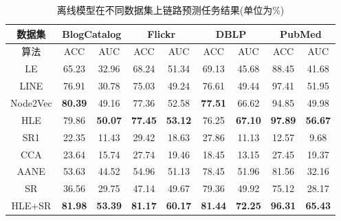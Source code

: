 \begin{table}[]
	\centering
	\caption{离线模型在不同数据集上链路预测任务结果(单位为\%)}
	\label{tab:off_link_prediction}
	\begin{tabular}{|c||c|c||c|c||c|c||c|c|}
		\hline
		数据集      & \multicolumn{2}{c||}{BlogCatalog} & \multicolumn{2}{c||}{Flickr}     & \multicolumn{2}{c||}{DBLP}   & \multicolumn{2}{c|}{PubMed}     \\ \hline\hline
		算法       & ACC             & AUC            & ACC            & AUC            & ACC            & AUC            & ACC            & AUC            \\ \hline
		LE       & 65.23           & 32.96          & 68.24          & 51.34          & 69.13          & 45.68          & 88.45          & 41.68          \\ \hline
		LINE     & 76.91           & 30.78          & 75.03          & 49.24          & 76.61          & 49.44          & 97.41          & 51.95 \\ \hline
		Node2Vec & \textbf{80.39}  & 49.16          & 77.36          & 52.58          & \textbf{77.51} & 66.62          & 94.85          & 49.98          \\ \hline
		HLE      & 79.86           & \textbf{50.07} & \textbf{77.45} & \textbf{53.12} & 76.25          & \textbf{67.10} & \textbf{97.89} & \textbf{56.67}          \\ \hline\hline
		SR1      & 22.35           & 11.43          & 29.42          & 18.63          & 27.86          & 11.13          & 12.57          & 9.68           \\ \hline\hline
		CCA      & 23.64           & 15.74          & 27.74          & 19.46          & 18.45          & 13.15          & 27.45          & 19.37          \\ \hline
		AANE     & 53.63           & 44.52          & 54.96          & 51.13 & 78.45          & 51.96          & 81.56 & 32.16          \\ \hline
		SR       & 36.56           & 29.75          & 47.14          & 49.67          & 79.36          & 49.92          & 75.12          & 28.17          \\ \hline
		HLE+SR   & \textbf{81.98}  & \textbf{53.39} & \textbf{81.17} & \textbf{60.17}          & \textbf{81.44} & \textbf{72.25} & \textbf{96.31}          & \textbf{65.43} \\ \hline
	\end{tabular}
\end{table}


